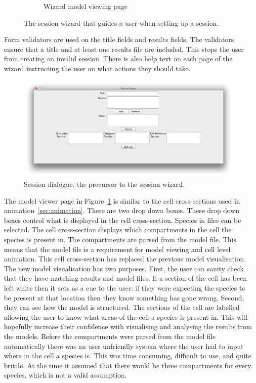 \begin{figure}[h!]
\begin{subfigure}[b]{0.4\textwidth}
        \caption{Wizard model viewing page}
        \label{fig:page_4}
    \end{subfigure}
    \caption{The session wizard that guides a user when setting up a session.}
    \label{fig:session_wizard}
\end{figure}

Form validators are used on the title fields and results fields.  The validators ensure that a title and at least one results file are included.  This stops the user from creating an invalid session.  There is also help text on each page of the wizard instructing the user on what actions they should take.

\begin{figure}[h!]
    \centering
    \includegraphics[height=0.5\textwidth]{images/old_wizard.png}
    \caption{Session dialogue, the precursor to the session wizard.}
    \label{fig:old_session_dialogue}
\end{figure}

The model viewer page in Figure~\ref{fig:page_4} is similar to the cell cross-sections used in animation~\ref{sec:animation}.  There are two drop down boxes.  These drop down boxes control what is displayed in the cell cross-section.  Species in files can be selected.  The cell cross-section displays which compartments in the cell the species is present in.  The compartments are parsed from the model file.  This means that the model file is a requirement for model viewing and cell level animation.  This cell cross-section has replaced the previous model visualisation.  The new model visualisation has two purposes. First, the user can sanity check that they have matching results and model files.  If a section of the cell has been left white then it acts as a cue to the user: if they were expecting the species to be present at that location then they know something has gone wrong.  Second, they can see how the model is structured.  The sections of the cell are labelled allowing the user to know what areas of the cell a species is present in.  This will hopefully increase their confidence with visualising and analysing the results from the models. Before the compartments were parsed from the model file automatically there was an user unfriendly system where the user had to input where in the cell a species is.  This was time consuming, difficult to use, and quite brittle.  At the time it assumed that there would be three compartments for every species, which is not a valid assumption.

